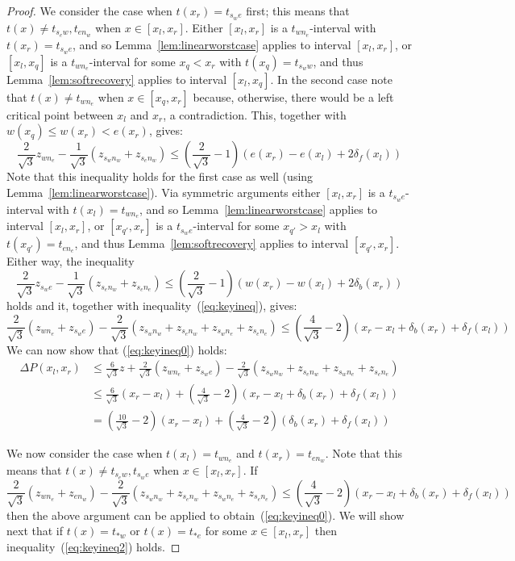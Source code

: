 \begin{proof}
 We consider the case when
$t(x_r) = t_{s_we}$ first; this means that $t(x) \not= t_{s_ew}, t_{en_w}$
when $x \in [x_l, x_r]$. 
Either $[x_l,x_r]$ is a $t_{wn_e}$-interval with $t(x_r) = t_{s_we}$, and so
Lemma~\ref{lem:linearworstcase} applies to interval $[x_l,x_r]$, or
$[x_l,x_q]$ is a $t_{wn_e}$-interval for some $x_q < x_r$ with 
$t(x_q) = t_{s_ww}$,
and thus Lemma~\ref{lem:softrecovery} applies to interval $[x_l,x_q]$. In the
second case note that $t(x) \not= t_{wn_e}$ when $x \in [x_q, x_r]$ because, 
otherwise, there would be a left critical point between $x_l$ and $x_r$, 
a contradiction. This, together with $w(x_q) \leq w(x_r) < e(x_r)$,
gives:
\begin{equation}
\label{eq:keyineq}
\frac{2}{\sqrt{3}}z_{wn_e}-\frac{1}{\sqrt{3}}(z_{s_wn_w}+z_{s_en_w}) \leq \left(\frac{2}{\sqrt{3}}-1\right)(e(x_r)-e(x_l)+2\delta_f(x_l))
\end{equation}
Note that this inequality holds for the first case as well
(using Lemma~\ref{lem:linearworstcase}). Via symmetric arguments either $[x_l,x_r]$ is a
$t_{s_we}$-interval with $t(x_l) = t_{wn_e}$, and so Lemma~\ref{lem:linearworstcase}
applies to interval $[x_l,x_r]$, 
or $[x_{q'},x_r]$ is a $t_{s_we}$-interval for some $x_{q'} > x_l$ with
$t(x_{q'}) = t_{en_e}$, and thus Lemma~\ref{lem:softrecovery} applies to interval
$[x_{q'},x_r]$. Either way, the inequality
\[\frac{2}{\sqrt{3}}z_{s_we}-\frac{1}{\sqrt{3}}(z_{s_en_w}+z_{s_en_e})\leq \left(\frac{2}{\sqrt{3}}-1\right)(w(x_r)-w(x_l)+2\delta_b(x_r))\]
holds and it, together with inequality~(\ref{eq:keyineq}), gives:
\[\frac{2}{\sqrt{3}}(z_{wn_e} +z_{s_we})-\frac{2}{\sqrt{3}}(z_{s_wn_w}+z_{s_en_w}+z_{s_wn_e}+z_{s_en_e})\leq \left(\frac{4}{\sqrt{3}}-2\right)(x_r-x_l+\delta_b(x_r)+\delta_f(x_l))\]
We can now show that (\ref{eq:keyineq0}) holds:
\begin{align*} \Delta P(x_l, x_r) & \leq \frac{6}{\sqrt{3}}z + \frac{2}{\sqrt{3}}(z_{wn_e} +z_{s_we}) - \frac{2}{\sqrt{3}}(z_{s_wn_w}+z_{s_en_w}+z_{s_wn_e}+z_{s_en_e}) \\ 
	& \leq \frac{6}{\sqrt{3}}(x_r - x_l) + \left(\frac{4}{\sqrt{3}}-2\right)(x_r-x_l+\delta_b(x_r)+\delta_f(x_l)) \\
        & = \left(\frac{10}{\sqrt{3}}-2\right)(x_r - x_l) + \left(\frac{4}{\sqrt{3}}-2\right)(\delta_b(x_r) + \delta_f(x_l))
\end{align*}

 We now consider the case when $t(x_l) = t_{wn_e}$ and $t(x_r) = t_{en_w}$. 
Note that this means that $t(x) \not= t_{s_ew}, t_{s_we}$ when $x \in [x_l, x_r]$. 
If 
\begin{equation}
\label{eq:keyineq2}
\frac{2}{\sqrt{3}}(z_{wn_e} +z_{en_w})-\frac{2}{\sqrt{3}}(z_{s_wn_w}+z_{s_en_w}+z_{s_wn_e}+z_{s_en_e})\leq
	\left(\frac{4}{\sqrt{3}}-2\right)(x_r-x_l+\delta_b(x_r)+\delta_f(x_l))
\end{equation}
then the above argument can be applied to obtain~(\ref{eq:keyineq0}). We will show next that if $t(x) = t_{\ast w}$ or $t(x) = t_{\ast e}$ for 
some $x \in [x_l, x_r]$ then inequality~(\ref{eq:keyineq2}) holds.


\end{proof}
